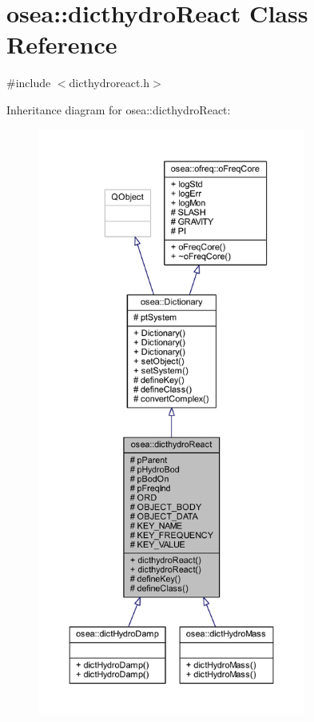 \hypertarget{classosea_1_1dicthydro_react}{\section{osea\-:\-:dicthydro\-React Class Reference}
\label{classosea_1_1dicthydro_react}
}


{\ttfamily \#include $<$dicthydroreact.\-h$>$}



Inheritance diagram for osea\-:\-:dicthydro\-React\-:
\nopagebreak
\begin{figure}[H]
\begin{center}
\leavevmode
\includegraphics[height=550pt]{classosea_1_1dicthydro_react__inherit__graph}
\end{center}
\end{figure}
